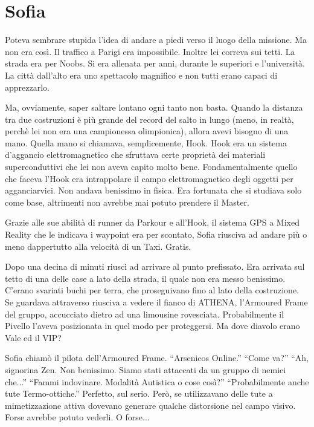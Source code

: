   \section*{Sofia}

    Poteva sembrare stupida l'idea di andare a piedi verso il luogo della missione. Ma non era così. Il traffico a
    Parigi era impossibile. Inoltre lei correva sui tetti. La strada era per Noobs. Si era allenata per anni, durante le
    superiori e l'università. La città dall'alto era uno spettacolo magnifico e non tutti erano capaci di apprezzarlo.
    
    Ma, ovviamente, saper saltare lontano ogni tanto non basta. Quando la distanza tra due costruzioni è più grande del
    record del salto in lungo (meno, in realtà, perchè lei non era una campionessa olimpionica), allora avevi bisogno di
    una mano. Quella mano si chiamava, semplicemente, Hook. Hook era un sistema d'aggancio elettromagnetico che
    sfruttava certe proprietà dei materiali superconduttivi che lei non aveva capito molto bene. Fondamentalmente quello
    che faceva l'Hook era intrappolare il campo elettromagnetico degli oggetti per agganciarvici. Non andava benissimo
    in fisica. Era fortunata che si studiava solo come base, altrimenti non avrebbe mai potuto prendere il Master.

    Grazie alle sue abilità di runner da Parkour e all'Hook, il sistema GPS a Mixed Reality che le indicava i waypoint
    era per scontato,  Sofia riusciva ad andare più o meno dappertutto alla velocità di un Taxi. Gratis.

    Dopo una decina di minuti riuscì ad arrivare al punto prefissato. Era arrivata sul tetto di una delle case a lato
    della strada, il quale non era messo benissimo. C'erano svariati buchi per terra, che proseguivano fino al lato
    della costruzione. Se guardava attraverso riusciva a vedere il fianco di ATHENA, l'Armoured Frame del gruppo,
    accucciato dietro ad una limousine rovesciata. Probabilmente il Pivello l'aveva posizionata in quel modo per
    proteggersi. Ma dove diavolo erano Vale ed il VIP?

    Sofia chiamò il pilota dell'Armoured Frame. ``Arsenicos Online.'' ``Come va?'' ``Ah, signorina Zen. Non benissimo.
    Siamo stati attaccati da un gruppo di nemici che...'' ``Fammi indovinare. Modalità Autistica o cose così?''
    ``Probabilmente anche tute Termo-ottiche.'' Perfetto, sul serio. Però, se utilizzavano delle tute a mimetizzazione
    attiva dovevano generare qualche distorsione nel campo visivo. Forse avrebbe potuto vederli. O forse...

